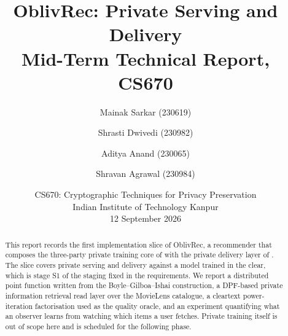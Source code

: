 \documentclass[11pt]{article}
\begin{document}
\title{\bfseries OblivRec: Private Serving and Delivery\\[0.3em]
       \large Mid-Term Technical Report, CS670}

\author{Mainak Sarkar (230619) \and Shrasti Dwivedi (230982) \and
        Aditya Anand (230065) \and Shravan Agrawal (230984)}

\date{CS670: Cryptographic Techniques for Privacy Preservation\\
      Indian Institute of Technology Kanpur \\
      12 September 2026}

\maketitle

\begin{abstract}
\noindent
This report records the first implementation slice of OblivRec, a
recommender that composes the three-party private training core of
\nudgeplain{} with the private delivery layer of \pirsonaplain{}. The slice
covers private serving and delivery against a model trained in the clear,
which is stage S1 of the staging fixed in the requirements. We report a
distributed point function written from the Boyle--Gilboa--Ishai
construction, a DPF-based private information retrieval read layer over the
MovieLens catalogue, a cleartext power-iteration factorisation used as the
quality oracle, and an experiment quantifying what an observer learns from
watching which items a user fetches. Private training itself is out of scope
here and is scheduled for the following phase.
\end{abstract}

\tableofcontents
\newpage











\end{document}
